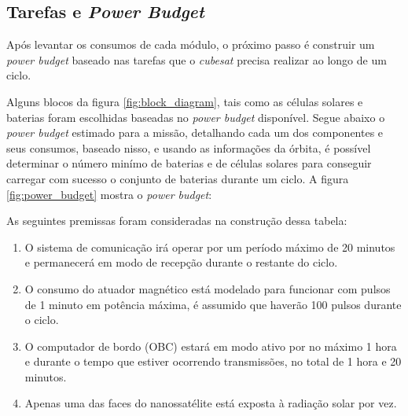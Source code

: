 \subsection*{Tarefas e \textit{Power Budget}}

Após levantar os consumos de cada módulo, o próximo passo é construir um \textit{power budget} baseado nas tarefas que o \textit{cubesat} precisa realizar ao longo de um ciclo.  

Alguns blocos da figura \ref{fig:block_diagram}, tais como as células solares e baterias foram escolhidas baseadas no \textit{power budget} disponível. Segue abaixo o \textit{power budget} estimado para a missão, detalhando cada um dos componentes e seus consumos, baseado nisso, e usando as informações da órbita, é possível determinar o número minímo de baterias e de células solares para conseguir carregar com sucesso o conjunto de baterias durante um ciclo. A figura \ref{fig:power_budget} mostra o \textit{power budget}:

\noindent
\begin{minipage}{\linewidth}
\label{fig:power_budget}
\end{minipage}

As seguintes premissas foram consideradas na construção dessa tabela:

\begin{enumerate}
    \item O sistema de comunicação irá operar por um período máximo de 20 minutos e permanecerá em modo de recepção durante o restante do ciclo.
    \item O consumo do atuador magnético está modelado para funcionar com pulsos de 1 minuto em potência máxima, é assumido que haverão 100 pulsos durante o ciclo.
    \item O computador de bordo (OBC) estará em modo ativo por no máximo 1 hora e durante o tempo que estiver ocorrendo transmissões, no total de 1 hora e 20 minutos.
    \item Apenas uma das faces do nanossatélite está exposta à radiação solar por vez.
\end{enumerate}


